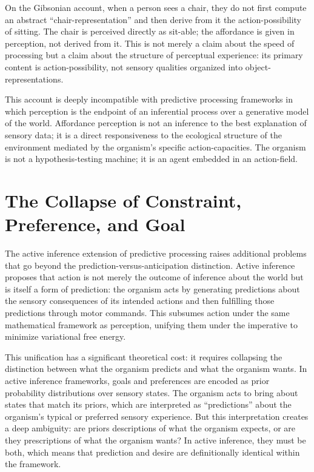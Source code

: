 \documentclass[12pt,a4paper]{report}
\theoremstyle{flyxion}
\begin{document}
On the Gibsonian account, when a person sees a chair, they do not first compute an abstract ``chair-representation'' and then derive from it the action-possibility of sitting. The chair is perceived directly as sit-able; the affordance is given in perception, not derived from it. This is not merely a claim about the speed of processing but a claim about the structure of perceptual experience: its primary content is action-possibility, not sensory qualities organized into object-representations.

This account is deeply incompatible with predictive processing frameworks in which perception is the endpoint of an inferential process over a generative model of the world. Affordance perception is not an inference to the best explanation of sensory data; it is a direct responsiveness to the ecological structure of the environment mediated by the organism's specific action-capacities. The organism is not a hypothesis-testing machine; it is an agent embedded in an action-field.

\section{The Collapse of Constraint, Preference, and Goal}

The active inference extension of predictive processing raises additional problems that go beyond the prediction-versus-anticipation distinction. Active inference proposes that action is not merely the outcome of inference about the world but is itself a form of prediction: the organism acts by generating predictions about the sensory consequences of its intended actions and then fulfilling those predictions through motor commands. This subsumes action under the same mathematical framework as perception, unifying them under the imperative to minimize variational free energy.

This unification has a significant theoretical cost: it requires collapsing the distinction between what the organism predicts and what the organism wants. In active inference frameworks, goals and preferences are encoded as prior probability distributions over sensory states. The organism acts to bring about states that match its priors, which are interpreted as ``predictions'' about the organism's typical or preferred sensory experience. But this interpretation creates a deep ambiguity: are priors descriptions of what the organism expects, or are they prescriptions of what the organism wants? In active inference, they must be both, which means that prediction and desire are definitionally identical within the framework.
\end{document}

